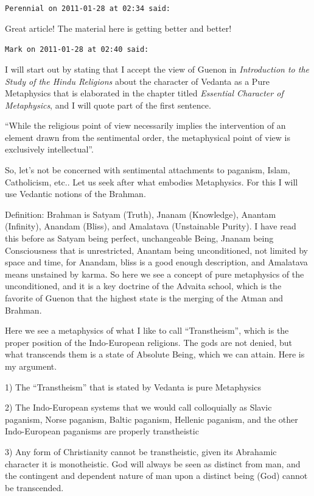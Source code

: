 \begin{footnotesize}
\begin{sffamily}
\texttt{Perennial on 2011-01-28 at 02:34 said:}

Great article! The material here is getting better and better!

\hfill

\texttt{Mark on 2011-01-28 at 02:40 said:}

I will start out by stating that I accept the view of Guenon in \textit{Introduction to the Study of the Hindu Religions} about the character of Vedanta as a Pure Metaphysics that is elaborated in the chapter titled \textit{Essential Character of Metaphysics}, and I will quote part of the first sentence.

``While the religious point of view necessarily implies the intervention of an element drawn from the sentimental order, the metaphysical point of view is exclusively intellectual''.

So, let's not be concerned with sentimental attachments to paganism, Islam, Catholicism, etc.. Let us seek after what embodies Metaphysics. For this I will use Vedantic notions of the Brahman.

Definition: Brahman is Satyam (Truth), Jnanam (Knowledge), Anantam (Infinity), Anandam (Bliss), and Amalatava (Unstainable Purity). I have read this before as Satyam being perfect, unchangeable Being, Jnanam being Consciousness that is unrestricted, Anantam being unconditioned, not limited by space and time, for Anandam, bliss is a good enough description, and Amalatava means unstained by karma. So here we see a concept of pure metaphysics of the unconditioned, and it is a key doctrine of the Advaita school, which is the favorite of Guenon that the highest state is the merging of the Atman and Brahman.

Here we see a metaphysics of what I like to call ``Transtheism'', which is the proper position of the Indo-European religions. The gods are not denied, but what transcends them is a state of Absolute Being, which we can attain. Here is my argument.

1) The ``Transtheism'' that is stated by Vedanta is pure Metaphysics

2) The Indo-European systems that we would call colloquially as Slavic paganism, Norse paganism, Baltic paganism, Hellenic paganism, and the other Indo-European paganisms are properly transtheistic

3) Any form of Christianity cannot be transtheistic, given its Abrahamic character it is monotheistic. God will always be seen as distinct from man, and the contingent and dependent nature of man upon a distinct being (God) cannot be transcended.


\end{sffamily}
\end{footnotesize}
